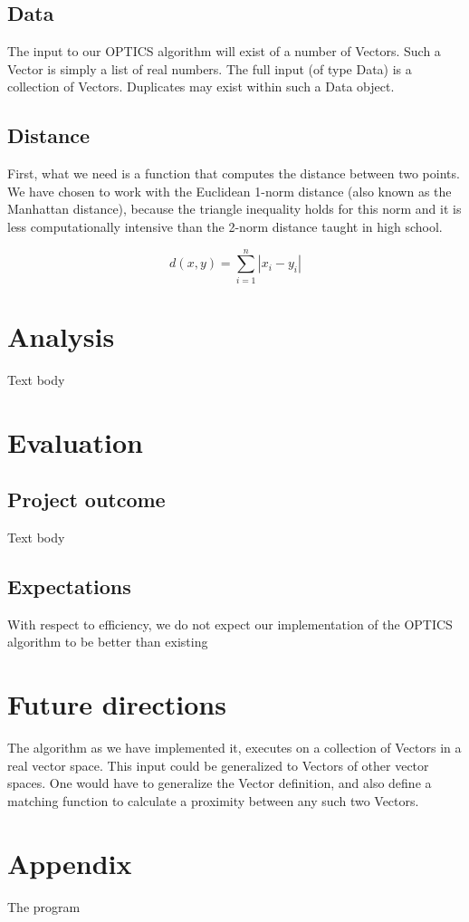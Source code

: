 \documentclass[12pt,a4paper]{article}
\begin{document}
\subsection{Data}
The input to our OPTICS algorithm will exist of a number of Vectors. Such a Vector is simply a list of real numbers. The full input (of type Data) is a collection of Vectors. Duplicates may exist within such a Data object.

\subsection{Distance}
First, what we need is a function that computes the distance between two points. We have chosen to work with the Euclidean 1-norm distance (also known as the Manhattan distance), because the triangle inequality holds for this norm and it is less computationally intensive than the 2-norm distance taught in high school.

\begin{equation}
d(x,y)=\sum_{i=1}^n |x_i-y_i|
\end{equation}

\clearpage
\section{Analysis}
Text body

\section{Evaluation}
\subsection{Project outcome}
Text body
\subsection{Expectations}
With respect to efficiency, we do not expect our implementation of the OPTICS algorithm to be better than existing 

\section{Future directions}
The algorithm as we have implemented it, executes on a collection of Vectors in a real vector space. This input could be generalized to Vectors of other vector spaces. One would have to generalize the Vector definition, and also define a matching function to calculate a proximity between any such two Vectors.

\clearpage
\section{Appendix}
The program
\end{document}
